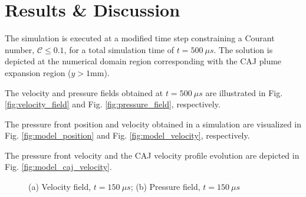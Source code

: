 \documentclass[a4paper]{iacas}%
\begin{document}
\section{Results \& Discussion}

The simulation is executed at a modified time step  constraining a Courant number, $\mathcal{C} \leq 0.1$, for a total simulation time of $t = 500~\mu s$. The solution is depicted at the numerical domain region corresponding with the CAJ plume expansion region ($ y > 1 \mathrm{mm} $). 

The velocity and pressure fields obtained at $ t = 500~\mu s $ are illustrated in Fig. \ref{fig:velocity_field} and Fig. \ref{fig:pressure_field}, respectively.

The pressure front position and velocity obtained in a simulation are visualized in Fig. \ref{fig:model_position} and Fig. \ref{fig:model_velocity}, respectively. 

The pressure front velocity and the CAJ velocity profile evolution are depicted in Fig. \ref{fig:model_caj_velocity}.

\begin{figure}
	\centering
	
	
	\caption{(a) Velocity field, $ t = 150~\mu s $; (b) Pressure field, $ t = 150~\mu s $}
\end{figure}
\end{document}
